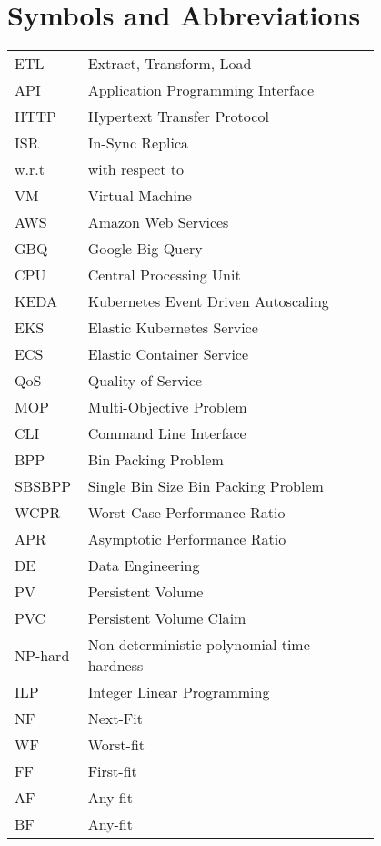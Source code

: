 \chapter*{Symbols and Abbreviations}

\begin{flushleft}
\begin{tabular}{l p{0.8\linewidth}}
ETL      & Extract, Transform, Load\\
API      & Application Programming Interface\\
HTTP     & Hypertext Transfer Protocol \\
ISR      & In-Sync Replica\\
w.r.t    & with respect to\\
VM       & Virtual Machine\\
AWS      & Amazon Web Services\\
GBQ      & Google Big Query\\
CPU      & Central Processing Unit\\
KEDA     & Kubernetes Event Driven Autoscaling\\
EKS      & Elastic Kubernetes Service\\
ECS      & Elastic Container Service\\
QoS      & Quality of Service\\
MOP      & Multi-Objective Problem\\
CLI      & Command Line Interface\\
BPP      & Bin Packing Problem\\
SBSBPP   & Single Bin Size Bin Packing Problem\\
WCPR     & Worst Case Performance Ratio\\
APR      & Asymptotic Performance Ratio\\
DE       & Data Engineering \\
PV       & Persistent Volume \\
PVC      & Persistent Volume Claim \\
NP-hard  & Non-deterministic polynomial-time hardness \\
ILP      & Integer Linear Programming \\
NF       & Next-Fit \\
WF       & Worst-fit \\
FF       & First-fit \\
AF       & Any-fit \\
BF       & Any-fit \\

\end{tabular}
\end{flushleft}
